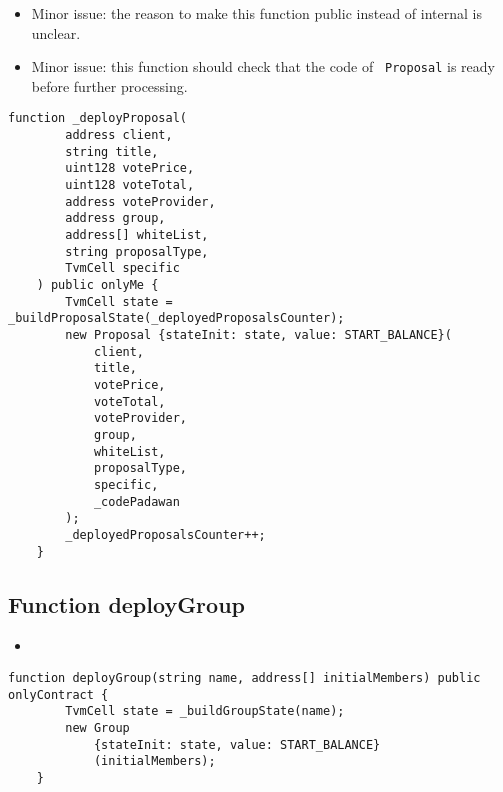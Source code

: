 \begin{itemize}
\item Minor issue: the reason to make this function public instead of
  internal is unclear.
\item Minor issue: this function should check that the code of {\tt
  Proposal} is ready before further processing.
\end{itemize}

\begin{lstlisting}[firstnumber=194]
    function _deployProposal(
        address client,
        string title,
        uint128 votePrice,
        uint128 voteTotal,
        address voteProvider,
        address group,
        address[] whiteList,
        string proposalType,
        TvmCell specific
    ) public onlyMe {
        TvmCell state = _buildProposalState(_deployedProposalsCounter);
        new Proposal {stateInit: state, value: START_BALANCE}(
            client,
            title,
            votePrice,
            voteTotal,
            voteProvider,
            group,
            whiteList,
            proposalType,
            specific,
            _codePadawan
        );
        _deployedProposalsCounter++;
    }
\end{lstlisting}

\subsection{Function deployGroup}

\begin{itemize}
\item {}
\end{itemize}

\begin{lstlisting}[firstnumber=221]
    function deployGroup(string name, address[] initialMembers) public onlyContract {
        TvmCell state = _buildGroupState(name);
        new Group
            {stateInit: state, value: START_BALANCE}
            (initialMembers);
    }
\end{lstlisting}

